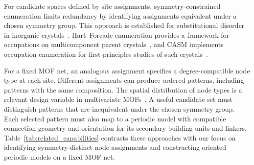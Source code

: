 \documentclass[a5paper, 10pt]{article}
\begin{document}
For candidate spaces defined by site assignments, symmetry-constrained enumeration limits redundancy by identifying assignments equivalent under a chosen symmetry group.
This approach is established for substitutional disorder in inorganic crystals~\cite{hart2012generating}. Hart--Forcade enumeration provides a framework for occupations on multicomponent parent crystals~\cite{hart2008algorithm}, and CASM implements occupation enumeration for first-principles studies of such crystals~\cite{PUCHALA2023111897}.%

For a fixed MOF net, an analogous assignment specifies a degree-compatible node type at each site. Different assignments can produce ordered patterns, including patterns with the same composition. The spatial distribution of node types is a relevant design variable in multivariate MOFs~\cite{ji2020sequencing}. A useful candidate set must distinguish patterns that are inequivalent under the chosen symmetry group. Each selected pattern must also map to a periodic model with compatible connection geometry and orientation for its secondary building units and linkers. Table~\ref{tab:related_capabilities} contrasts these approaches with our focus on identifying symmetry-distinct node assignments and constructing oriented periodic models on a fixed MOF net. %
\end{document}
